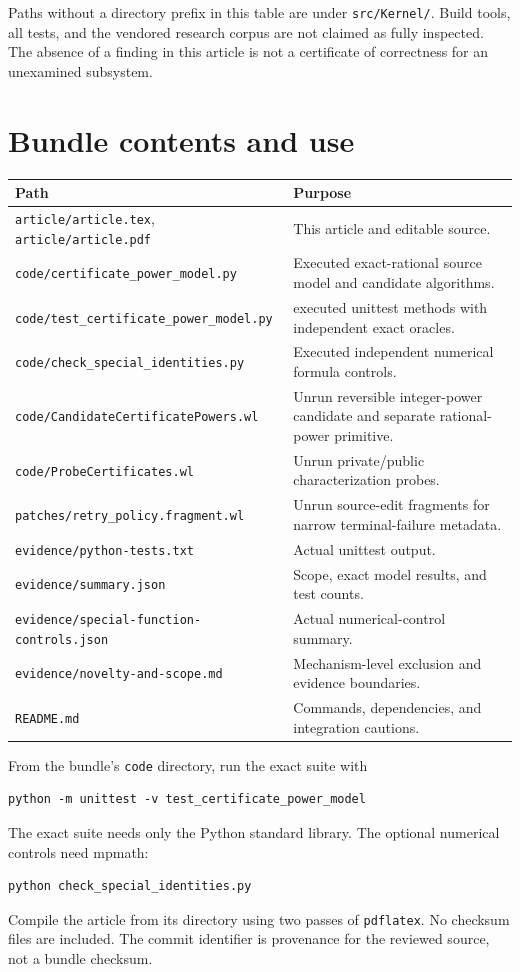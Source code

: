 \documentclass[11pt,a4paper]{article}
\newcommand{\code}[1]{\nolinkurl{#1}}
\begin{document}
Paths without a directory prefix in this table are under \code{src/Kernel/}. Build tools, all tests, and the vendored research corpus are not claimed as fully inspected. The absence of a finding in this article is not a certificate of correctness for an unexamined subsystem.

\section{Bundle contents and use}

\begin{longtable}{@{}>{\raggedright\arraybackslash}p{}>{\raggedright\arraybackslash}p{}@{}}
\toprule
Path & Purpose\\
\midrule
\endhead
\code{article/article.tex}, \code{article/article.pdf} & This article and editable source.\\
\code{code/certificate_power_model.py} & Executed exact-rational source model and candidate algorithms.\\
\code{code/test_certificate_power_model.py} & 22 executed unittest methods with independent exact oracles.\\
\code{code/check_special_identities.py} & Executed independent numerical formula controls.\\
\code{code/CandidateCertificatePowers.wl} & Unrun reversible integer-power candidate and separate rational-power primitive.\\
\code{code/ProbeCertificates.wl} & Unrun private/public characterization probes.\\
\code{patches/retry_policy.fragment.wl} & Unrun source-edit fragments for narrow terminal-failure metadata.\\
\code{evidence/python-tests.txt} & Actual unittest output.\\
\code{evidence/summary.json} & Scope, exact model results, and test counts.\\
\code{evidence/special-function-controls.json} & Actual numerical-control summary.\\
\code{evidence/novelty-and-scope.md} & Mechanism-level exclusion and evidence boundaries.\\
\code{README.md} & Commands, dependencies, and integration cautions.\\
\bottomrule
\end{longtable}

From the bundle's \code{code} directory, run the exact suite with
\begin{lstlisting}[language={}]
python -m unittest -v test_certificate_power_model
\end{lstlisting}
The exact suite needs only the Python standard library. The optional numerical controls need mpmath:
\begin{lstlisting}[language={}]
python check_special_identities.py
\end{lstlisting}
Compile the article from its directory using two passes of \code{pdflatex}. No checksum files are included. The commit identifier is provenance for the reviewed source, not a bundle checksum.
\end{document}
